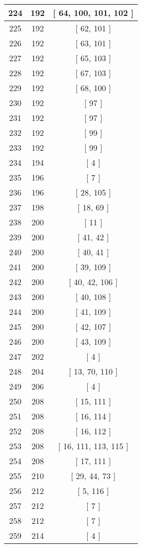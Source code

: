 \begin{center}
\begin{longtable}[H]{|| c c c ||}
\\\hline
224 & 192 & [ 64, 100, 101, 102 ]
\\\hline
225 & 192 & [ 62, 101 ]
\\\hline
226 & 192 & [ 63, 101 ]
\\\hline
227 & 192 & [ 65, 103 ]
\\\hline
228 & 192 & [ 67, 103 ]
\\\hline
229 & 192 & [ 68, 100 ]
\\\hline
230 & 192 & [ 97 ]
\\\hline
231 & 192 & [ 97 ]
\\\hline
232 & 192 & [ 99 ]
\\\hline
233 & 192 & [ 99 ]
\\\hline
234 & 194 & [ 4 ]
\\\hline
235 & 196 & [ 7 ]
\\\hline
236 & 196 & [ 28, 105 ]
\\\hline
237 & 198 & [ 18, 69 ]
\\\hline
238 & 200 & [ 11 ]
\\\hline
239 & 200 & [ 41, 42 ]
\\\hline
240 & 200 & [ 40, 41 ]
\\\hline
241 & 200 & [ 39, 109 ]
\\\hline
242 & 200 & [ 40, 42, 106 ]
\\\hline
243 & 200 & [ 40, 108 ]
\\\hline
244 & 200 & [ 41, 109 ]
\\\hline
245 & 200 & [ 42, 107 ]
\\\hline
246 & 200 & [ 43, 109 ]
\\\hline
247 & 202 & [ 4 ]
\\\hline
248 & 204 & [ 13, 70, 110 ]
\\\hline
249 & 206 & [ 4 ]
\\\hline
250 & 208 & [ 15, 111 ]
\\\hline
251 & 208 & [ 16, 114 ]
\\\hline
252 & 208 & [ 16, 112 ]
\\\hline
253 & 208 & [ 16, 111, 113, 115 ]
\\\hline
254 & 208 & [ 17, 111 ]
\\\hline
255 & 210 & [ 29, 44, 73 ]
\\\hline
256 & 212 & [ 5, 116 ]
\\\hline
257 & 212 & [ 7 ]
\\\hline
258 & 212 & [ 7 ]
\\\hline
259 & 214 & [ 4 ]
\\\hline

\end{longtable}
\end{center}

